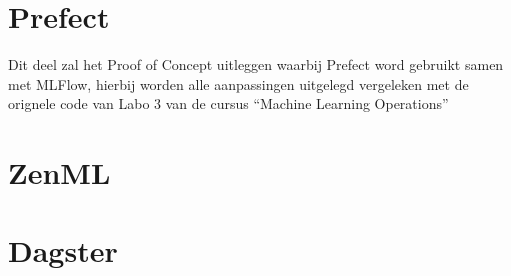 \section*{Prefect}

Dit deel zal het Proof of Concept uitleggen waarbij Prefect word gebruikt samen met MLFlow, hierbij worden alle aanpassingen uitgelegd vergeleken met de orignele code van Labo 3 van de cursus ``Machine Learning Operations''

\section*{ZenML}

\section*{Dagster}



